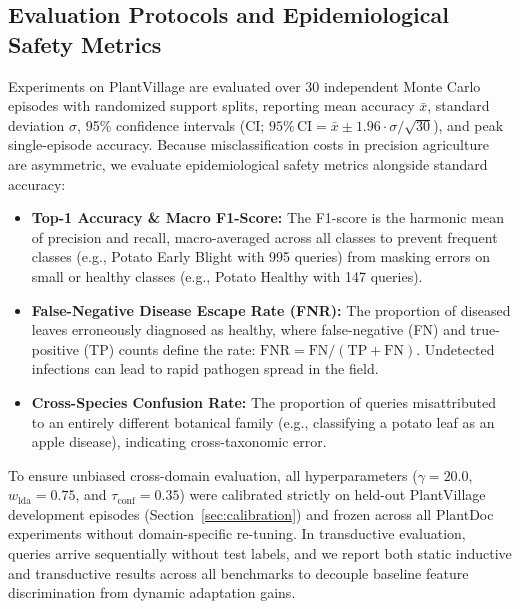 \documentclass[preprint,12pt]{elsarticle}
\begin{document}
\subsection{Evaluation Protocols and Epidemiological Safety Metrics}
\label{sec:metrics}
Experiments on PlantVillage are evaluated over 30 independent Monte Carlo episodes with randomized support splits, reporting mean accuracy $\bar{x}$, standard deviation $\sigma$, 95\% confidence intervals (CI; $95\%\,\text{CI} = \bar{x} \pm 1.96 \cdot \sigma / \sqrt{30}$), and peak single-episode accuracy. Because misclassification costs in precision agriculture are asymmetric, we evaluate epidemiological safety metrics alongside standard accuracy:
\begin{itemize}
    \item \textbf{Top-1 Accuracy \& Macro F1-Score:} The F1-score is the harmonic mean of precision and recall, macro-averaged across all classes to prevent frequent classes (e.g., Potato Early Blight with 995 queries) from masking errors on small or healthy classes (e.g., Potato Healthy with 147 queries).
    \item \textbf{False-Negative Disease Escape Rate (FNR):} The proportion of diseased leaves erroneously diagnosed as healthy, where false-negative (FN) and true-positive (TP) counts define the rate: $\text{FNR} = \text{FN} / (\text{TP} + \text{FN})$. Undetected infections can lead to rapid pathogen spread in the field.
    \item \textbf{Cross-Species Confusion Rate:} The proportion of queries misattributed to an entirely different botanical family (e.g., classifying a potato leaf as an apple disease), indicating cross-taxonomic error.
\end{itemize}

To ensure unbiased cross-domain evaluation, all hyperparameters ($\gamma = 20.0$, $w_{\text{lda}} = 0.75$, and $\tau_{\text{conf}} = 0.35$) were calibrated strictly on held-out PlantVillage development episodes (Section~\ref{sec:calibration}) and frozen across all PlantDoc experiments without domain-specific re-tuning. In transductive evaluation, queries arrive sequentially without test labels, and we report both static inductive and transductive results across all benchmarks to decouple baseline feature discrimination from dynamic adaptation gains.
\end{document}
